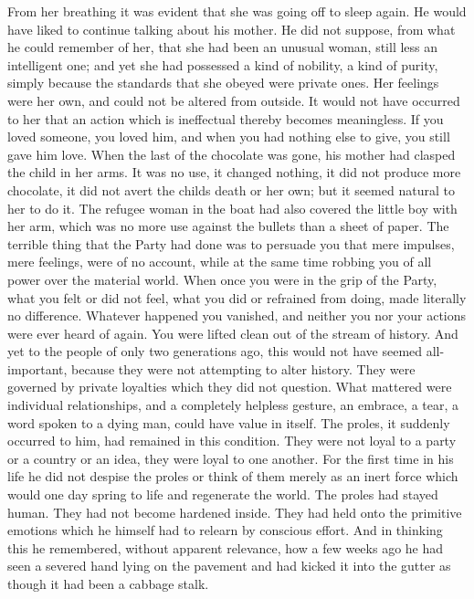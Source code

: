 From her breathing it was evident that she was going off to sleep again.
He would have liked to continue talking about his mother. He did not
suppose, from what he could remember of her, that she had been an
unusual woman, still less an intelligent one; and yet she had possessed
a kind of nobility, a kind of purity, simply because the standards that
she obeyed were private ones. Her feelings were her own, and could not
be altered from outside. It would not have occurred to her that an
action which is ineffectual thereby becomes meaningless. If you loved
someone, you loved him, and when you had nothing else to give, you still
gave him love. When the last of the chocolate was gone, his mother had
clasped the child in her arms. It was no use, it changed nothing, it did
not produce more chocolate, it did not avert the child\textquotesingle s
death or her own; but it seemed natural to her to do it. The refugee
woman in the boat had also covered the little boy with her arm, which
was no more use against the bullets than a sheet of paper. The terrible
thing that the Party had done was to persuade you that mere impulses,
mere feelings, were of no account, while at the same time robbing you of
all power over the material world. When once you were in the grip of the
Party, what you felt or did not feel, what you did or refrained from
doing, made literally no difference. Whatever happened you vanished, and
neither you nor your actions were ever heard of again. You were lifted
clean out of the stream of history. And yet to the people of only two
generations ago, this would not have seemed all-important, because they
were not attempting to alter history. They were governed by private
loyalties which they did not question. What mattered were individual
relationships, and a completely helpless gesture, an embrace, a tear, a
word spoken to a dying man, could have value in itself. The proles, it
suddenly occurred to him, had remained in this condition. They were not
loyal to a party or a country or an idea, they were loyal to one
another. For the first time in his life he did not despise the proles or
think of them merely as an inert force which would one day spring to
life and regenerate the world. The proles had stayed human. They had not
become hardened inside. They had held onto the primitive emotions which
he himself had to relearn by conscious effort. And in thinking this he
remembered, without apparent relevance, how a few weeks ago he had seen
a severed hand lying on the pavement and had kicked it into the gutter
as though it had been a cabbage stalk.

